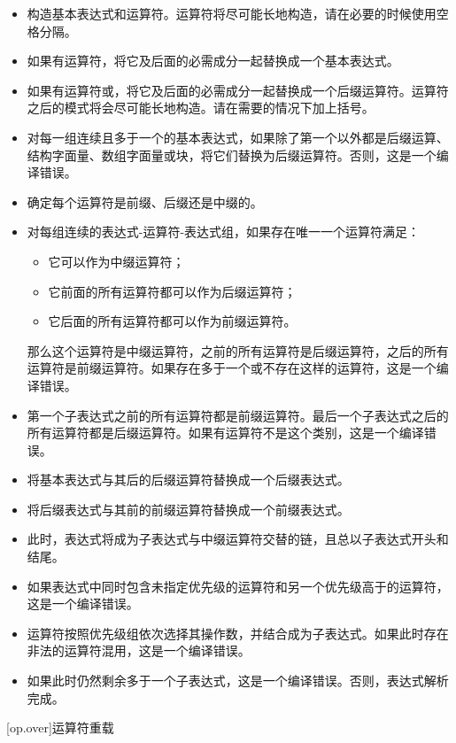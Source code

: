 \begin{itemize}
    \item 构造基本表达式和运算符。运算符将尽可能长地构造，请在必要的时候使用空格分隔。
    \item 如果有运算符，将它及后面的必需成分一起替换成一个基本表达式。
    \item 如果有运算符或，将它及后面的必需成分一起替换成一个后缀运算符。\enternote {}运算符之后的模式将会尽可能长地构造。请在需要的情况下加上括号。\exitnote
    \item 对每一组连续且多于一个的基本表达式，如果除了第一个以外都是后缀运算、结构字面量、数组字面量或块，将它们替换为后缀运算符。否则，这是一个编译错误。
    \item 确定每个运算符是前缀、后缀还是中缀的。
    \item 对每组连续的表达式-运算符-表达式组，如果存在唯一一个运算符满足：
    \begin{itemize}
        \item 它可以作为中缀运算符；
        \item 它前面的所有运算符都可以作为后缀运算符；
        \item 它后面的所有运算符都可以作为前缀运算符。
    \end{itemize}
    那么这个运算符是中缀运算符，之前的所有运算符是后缀运算符，之后的所有运算符是前缀运算符。如果存在多于一个或不存在这样的运算符，这是一个编译错误。
    \item 第一个子表达式之前的所有运算符都是前缀运算符。最后一个子表达式之后的所有运算符都是后缀运算符。如果有运算符不是这个类别，这是一个编译错误。
    \item 将基本表达式与其后的后缀运算符替换成一个后缀表达式。
    \item 将后缀表达式与其前的前缀运算符替换成一个前缀表达式。
    \item 此时，表达式将成为子表达式与中缀运算符交替的链，且总以子表达式开头和结尾。
    \item 如果表达式中同时包含未指定优先级的运算符和另一个优先级高于\tcode{==}的运算符，这是一个编译错误。
    \item 运算符按照优先级组依次选择其操作数，并结合成为子表达式。如果此时存在非法的运算符混用，这是一个编译错误。
    \item 如果此时仍然剩余多于一个子表达式，这是一个编译错误。否则，表达式解析完成。
\end{itemize}

[op.over]{运算符重载}

